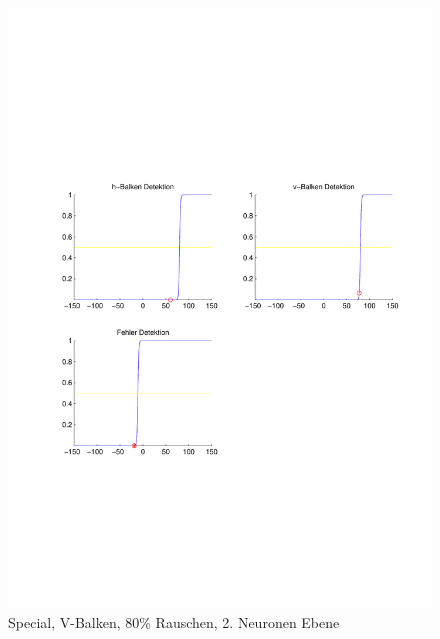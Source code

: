 \begin{figure}[hbt]
\begin{minipage}{0.8 \textwidth}
		\includegraphics[width=\textwidth]{./Bilder/Auswertung/Endergebnis/TypeSpecial_Rauschen80_V_Line_Layer2}
		\caption{Special, V-Balken, 80\% Rauschen, 2. Neuronen Ebene}
		\label{Special_V_80_2}
	\end{minipage}
\end{figure}
\clearpage

